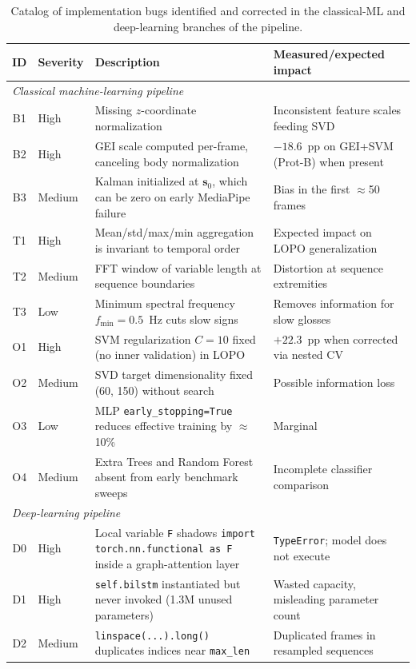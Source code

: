 \documentclass[journal]{IEEEtran}
\begin{document}
\begin{table}[t]
\centering
\caption{Catalog of implementation bugs identified and corrected in the classical-ML and deep-learning branches of the pipeline.}
\label{tab:bugcatalog}
\begin{tabular}{clp{9.5cm}l}
\toprule
ID & Severity & Description & Measured/expected impact \\
\midrule
\multicolumn{4}{l}{\textit{Classical machine-learning pipeline}} \\
B1 & High & Missing $z$-coordinate normalization & Inconsistent feature scales feeding SVD \\
B2 & High & GEI scale computed per-frame, canceling body normalization & $-18.6$~pp on GEI+SVM (Prot-B) when present \\
B3 & Medium & Kalman initialized at $\mathbf{s}_0$, which can be zero on early MediaPipe failure & Bias in the first $\approx$50 frames \\
T1 & High & Mean/std/max/min aggregation is invariant to temporal order & Expected impact on LOPO generalization \\
T2 & Medium & FFT window of variable length at sequence boundaries & Distortion at sequence extremities \\
T3 & Low & Minimum spectral frequency $f_{\min}=0.5$~Hz cuts slow signs & Removes information for slow glosses \\
O1 & High & SVM regularization $C=10$ fixed (no inner validation) in LOPO & $+22.3$~pp when corrected via nested CV \\
O2 & Medium & SVD target dimensionality fixed (60, 150) without search & Possible information loss \\
O3 & Low & MLP \texttt{early\_stopping=True} reduces effective training by $\approx$10\% & Marginal \\
O4 & Medium & Extra Trees and Random Forest absent from early benchmark sweeps & Incomplete classifier comparison \\
\midrule
\multicolumn{4}{l}{\textit{Deep-learning pipeline}} \\
D0 & High & Local variable \texttt{F} shadows \texttt{import torch.nn.functional as F} inside a graph-attention layer & \texttt{TypeError}; model does not execute \\
D1 & High & \texttt{self.bilstm} instantiated but never invoked (1.3M unused parameters) & Wasted capacity, misleading parameter count \\
D2 & Medium & \texttt{linspace(...).long()} duplicates indices near \texttt{max\_len} & Duplicated frames in resampled sequences \\

\end{tabular}
\end{table}
\end{document}
